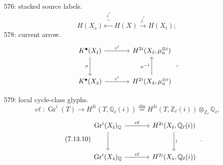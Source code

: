 \documentclass{article}
\newcommand{\Gr}{\operatorname{Gr}}
\begin{document}
576: stacked source labels.
\[
  H(X_s)\xleftarrow{\substack{i^*\\\sim}}H(X)\xrightarrow{j^*}H(X_t);
\]
578: current arrow.
\[
\begin{tikzcd}[column sep=large,row sep=large]
K^\bullet(X_{\bar t}) \arrow[r,"c^i"] \arrow[d,"\sigma"'] &
H^{2i}(X_{\bar t},\mu_n^{\otimes i})\\
K^\bullet(X_{\bar s}) \arrow[r,"c^i"] &
H^{2i}(X_{\bar s},\mu_n^{\otimes i}) \arrow[u,"\sigma^{-1}"]
\end{tikzcd}
\;,
\]

579: local cycle-class glyphs.
\begin{equation}\tag{7.13.7}
  \operatorname{c\ell}:\Gr^i(T)\longrightarrow H^{2i}(T,\mathbb Q_\ell(i))
  \stackrel{\mathrm{dfn}}{=}
  H^{2i}(T,\mathbb Z_\ell(i))\otimes_{\mathbb Z_\ell}\mathbb Q_\ell,
\end{equation}
\begin{equation}\tag{7.13.10}
\begin{tikzcd}[column sep=large,row sep=large]
\Gr^i(X_{\bar t})_{\mathbb Q} \arrow[r,"\operatorname{c\ell}"] \arrow[d] &
H^{2i}(X_{\bar t},\mathbb Q_\ell(i)) \arrow[d,"\wr"]\\
\Gr^i(X_{\bar s})_{\mathbb Q} \arrow[r,"\operatorname{c\ell}"] &
H^{2i}(X_{\bar s},\mathbb Q_\ell(i))
\end{tikzcd}
\;.
\end{equation}
\end{document}
